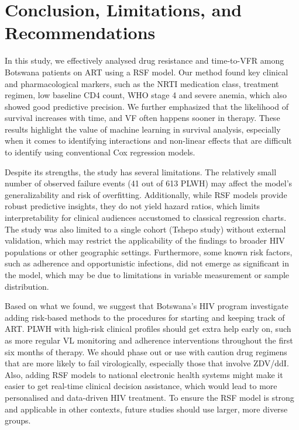 \documentclass[10pt]{NSP1}
\begin{document}
\section{Conclusion, Limitations, and Recommendations}
In this study, we effectively analysed drug resistance and time-to-VFR among Botswana patients on ART using a RSF model. Our method found key clinical and pharmacological markers, such as the NRTI medication class, treatment regimen, low baseline CD4 count, WHO stage 4 and severe anemia, which also showed good predictive precision. We further emphasized that the likelihood of survival increases with time, and VF often happens sooner in therapy. These results highlight the value of machine learning in survival analysis, especially when it comes to identifying interactions and non-linear effects that are difficult to identify using conventional Cox regression models.

Despite its strengths, the study has several limitations. The relatively small number of observed failure events (41 out of 613 PLWH) may affect the model’s generalizability and risk of overfitting. Additionally, while RSF models provide robust predictive insights, they do not yield hazard ratios, which limits interpretability for clinical audiences accustomed to classical regression charts. The study was also limited to a single cohort (Tshepo study) without external validation, which may restrict the applicability of the findings to broader HIV populations or other geographic settings. Furthermore, some known risk factors, such as adherence and opportunistic infections, did not emerge as significant in the model, which may be due to limitations in variable measurement or sample distribution.

Based on what we found, we suggest that Botswana's HIV program investigate adding risk-based methods to the procedures for starting and keeping track of ART. PLWH with high-risk clinical profiles should get extra help early on, such as more regular VL monitoring and adherence interventions throughout the first six months of therapy. We should phase out or use with caution drug regimens that are more likely to fail virologically, especially those that involve ZDV/ddI. Also, adding RSF models to national electronic health systems might make it easier to get real-time clinical decision assistance, which would lead to more personalised and data-driven HIV treatment. To ensure the RSF model is strong and applicable in other contexts, future studies should use larger, more diverse groups.
\end{document}
